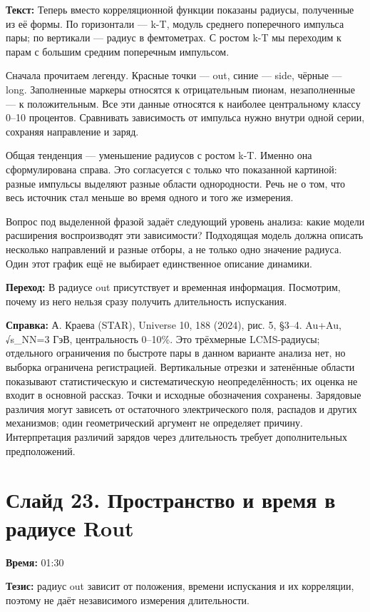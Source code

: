 \documentclass[11pt,a4paper]{article}
\begin{document}
\textbf{Текст:} Теперь вместо корреляционной функции показаны радиусы, полученные из её формы. По горизонтали — k-T, модуль среднего поперечного импульса пары; по вертикали — радиус в фемтометрах. С ростом k-T мы переходим к парам с большим средним поперечным импульсом.

Сначала прочитаем легенду. Красные точки — out, синие — side, чёрные — long. Заполненные маркеры относятся к отрицательным пионам, незаполненные — к положительным. Все эти данные относятся к наиболее центральному классу 0–10 процентов. Сравнивать зависимость от импульса нужно внутри одной серии, сохраняя направление и заряд.

Общая тенденция — уменьшение радиусов с ростом k-T. Именно она сформулирована справа. Это согласуется с только что показанной картиной: разные импульсы выделяют разные области однородности. Речь не о том, что весь источник стал меньше во время одного и того же измерения.

Вопрос под выделенной фразой задаёт следующий уровень анализа: какие модели расширения воспроизводят эти зависимости? Подходящая модель должна описать несколько направлений и разные отборы, а не только одно значение радиуса. Один этот график ещё не выбирает единственное описание динамики.

\textbf{Переход:} В радиусе out присутствует и временная информация. Посмотрим, почему из него нельзя сразу получить длительность испускания.

\textbf{Справка:} А. Краева (STAR), Universe 10, 188 (2024), рис. 5, §3–4. Au+Au, √s\_NN=3 ГэВ, центральность 0–10\%. Это трёхмерные LCMS-радиусы; отдельного ограничения по быстроте пары в данном варианте анализа нет, но выборка ограничена регистрацией. Вертикальные отрезки и затенённые области показывают статистическую и систематическую неопределённость; их оценка не входит в основной рассказ. Точки и исходные обозначения сохранены. Зарядовые различия могут зависеть от остаточного электрического поля, распадов и других механизмов; один геометрический аргумент не определяет причину. Интерпретация различий зарядов через длительность требует дополнительных предположений.

\clearpage
\section*{Слайд 23. Пространство и время в радиусе Rout}
\textbf{Время:} 01:30

\textbf{Тезис:} радиус out зависит от положения, времени испускания и их корреляции, поэтому не даёт независимого измерения длительности.
\end{document}
